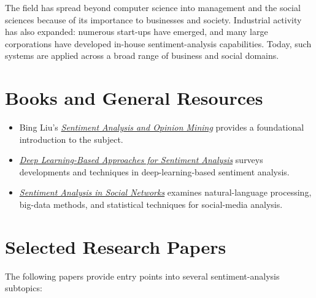 \documentclass[12pt,openany]{book}
\theoremstyle{definition}
\theoremstyle{remark}
\begin{document}
The field has spread beyond computer science into management and the social
sciences because of its importance to businesses and society. Industrial
activity has also expanded: numerous start-ups have emerged, and many large
corporations have developed in-house sentiment-analysis capabilities. Today,
such systems are applied across a broad range of business and social domains.

\section{Books and General Resources}

\begin{itemize}
    \item Bing Liu's
    \href{https://www.cs.uic.edu/~liub/FBS/SentimentAnalysis-and-OpinionMining.pdf}
    {\emph{Sentiment Analysis and Opinion Mining}} provides a foundational
    introduction to the subject.

    \item \href{https://link.springer.com/book/10.1007/978-981-15-1216-2}
    {\emph{Deep Learning-Based Approaches for Sentiment Analysis}} surveys
    developments and techniques in deep-learning-based sentiment analysis.

    \item \href{https://shop.elsevier.com/books/sentiment-analysis-in-social-networks/pozzi/978-0-12-804412-4}
    {\emph{Sentiment Analysis in Social Networks}} examines natural-language
    processing, big-data methods, and statistical techniques for social-media
    analysis.
\end{itemize}

\section{Selected Research Papers}

The following papers provide entry points into several sentiment-analysis
subtopics:
\end{document}
